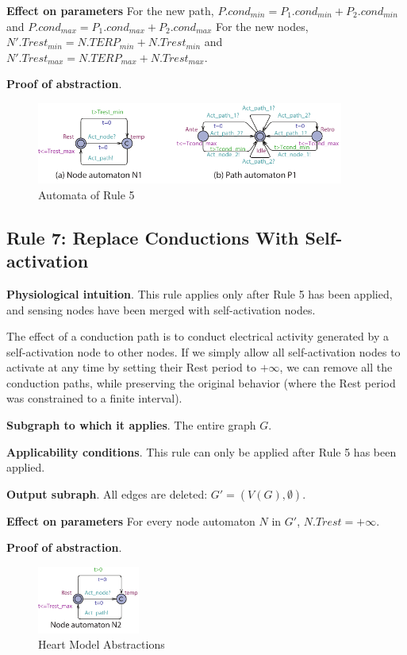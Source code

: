 \textbf{Effect on parameters}
For the new path, $P.cond_{min}=P_1.cond_{min}+P_2.cond_{min}$ and 
$P.cond_{max}=P_1.cond_{max}+P_2.cond_{max}$
For the new nodes, $N'.Trest_{min}=N.TERP_{min}+N.Trest_{min}$ and 
$N'.Trest_{max}=N.TERP_{max}+N.Trest_{max}$.


\textbf{Proof of abstraction}.

\begin{figure}[!h]
	\centering
	\includegraphics[width=0.9\textwidth]{figs/rule5.pdf}
	\caption{\small Automata of Rule 5}
	\label{fig:rule5}
\end{figure}

\subsection{Rule 7: Replace Conductions With Self-activation}
\textbf{Physiological intuition}. 
This rule applies only after Rule 5 has been applied, and sensing nodes have been merged with self-activation nodes.

The effect of a conduction path is to conduct electrical activity generated by a self-activation node to other nodes. 
If we simply allow all self-activation nodes to activate at any time by setting their Rest period to $+\infty$, we can remove all the conduction paths, while preserving the original behavior (where the Rest period was constrained to a finite interval).

\textbf{Subgraph to which it applies}.
The entire graph $G$.

\textbf{Applicability conditions}.
This rule can only be applied after Rule 5 has been applied.

\textbf{Output subraph}.
All edges are deleted: $G' = (V(G), \emptyset)$.

\textbf{Effect on parameters}
For every node automaton $N$ in $G'$, $N.Trest = +\infty$.

\textbf{Proof of abstraction}.

\begin{figure}[!h]
	\centering
	\includegraphics[width=0.3\textwidth]{figs/rule6.pdf}
	\caption{\small Heart Model Abstractions}
	\label{fig:rule6}
\end{figure}

